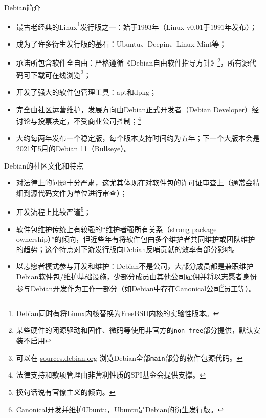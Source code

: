 
\begin{frame}{Debian简介}
	\begin{itemize}
		\item 最古老经典的Linux\footnote{Debian同时有将Linux内核替换为FreeBSD内核的实验性版本。}发行版之一：始于1993年（Linux v0.01于1991年发布）；
		\item 成为了许多衍生发行版的基石：Ubuntu、Deepin、Linux Mint等；
		\item 承诺所包含软件全自由：严格遵循《Debian自由软件指导方针》\footnote{某些硬件的闭源驱动和固件、微码等使用非官方的\texttt{non-free}部分提供，默认安装不启用}，所有源代码可下载可在线浏览\footnote{可以在 \href{https://sources.debian.org}{sources.debian.org} 浏览Debian全部\texttt{main}部分的软件包源代码。}；
		\item 开发了强大的软件包管理工具：apt和dpkg；
		\item 完全由社区运营维护，发展方向由Debian正式开发者（Debian Developer）经讨论与投票决定，不受商业公司控制；\footnote{法律支持和款项管理由非营利性质的SPI基金会提供支撑。}
		\item 大约每两年发布一个稳定版，每个版本支持时间约为五年；下一个大版本会是2021年5月的Debian 11（Bullseye）。
	\end{itemize}
\end{frame}

\begin{frame}{Debian的社区文化和特点}
	\begin{itemize}
		\item 对法律上的问题十分严肃，这尤其体现在对软件包的许可证审查上（通常会精细到源代码文件为单位进行审查）；
		\item 开发流程上比较严谨\footnote{换句话说有官僚主义的倾向。}；
		\item 软件包维护传统上有较强的“维护者强所有关系（strong package ownership）”的倾向，但近些年有将软件包由多个维护者共同维护或团队维护的趋势；这个特点对下游发行版向Debian反哺贡献的效率有部分影响。
		\item 以志愿者模式参与开发和维护：Debian不是公司，大部分成员都是兼职维护Debian软件包/维护基础设施，少部分成员由其他公司雇佣并将以志愿者身份参与Debian开发作为工作一部分（如Debian中存在Canonical公司\footnote{Canonical开发并维护Ubuntu，Ubuntu是Debian的衍生发行版。}员工等）。
	\end{itemize}
\end{frame}

